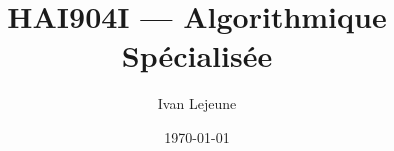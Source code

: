 
















\title{\color{astral} \sffamily \bfseries HAI904I --- Algorithmique Spécialisée}
\author{Ivan Lejeune}
\date{\today}


    \maketitle
    \tableofcontents

    \newpage
    
    



